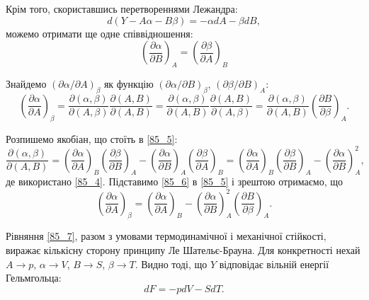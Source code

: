 Крім того, скориставшись перетвореннями Лежандра:
\begin{equation} \label{85_3}
d(Y - A \alpha - B \beta) = -\alpha dA - \beta dB,
\end{equation}
%
можемо отримати ще одне співвідношення:
\begin{equation} \label{85_4}
\left(\frac{\partial \alpha}{\partial B}\right)_A = \left(\frac{\partial \beta}{\partial A}\right)_B
\end{equation}

Знайдемо $(\partial \alpha / \partial A)_\beta$ як функцію $(\partial \alpha / \partial B)_\beta$, $(\partial \beta / \partial B)_A$:
\begin{equation} \label{85_5}
\left(\frac{\partial \alpha}{\partial A}\right)_\beta = \frac{\partial (\alpha, \beta)}{\partial (A, \beta)} \frac{\partial (A, B)}{\partial (A, B)} = \frac{\partial (\alpha, \beta)}{\partial (A, B)} \frac{\partial (A, B)}{\partial (A, \beta)} = \frac{\partial (\alpha, \beta)}{\partial (A, B)} \left(\frac{\partial B}{\partial \beta}\right)_A.
\end{equation}

Розпишемо якобіан, що стоїть в \eqref{85_5}:
\begin{equation} \label{85_6}
\frac{\partial (\alpha, \beta)}{\partial (A, B)} = \left(\frac{\partial \alpha}{\partial A}\right)_B \left(\frac{\partial \beta}{\partial B}\right)_A - \left(\frac{\partial \alpha}{\partial B}\right)_A \left(\frac{\partial \beta}{\partial A}\right)_B = \left(\frac{\partial \alpha}{\partial A}\right)_B \left(\frac{\partial \beta}{\partial B}\right)_A - \left(\frac{\partial \alpha}{\partial B}\right)_A^2,
\end{equation}
%
де використано \eqref{85_4}. Підставимо \eqref{85_6} в \eqref{85_5} і зрештою отримаємо, що
\begin{equation} \label{85_7}
\left(\frac{\partial \alpha}{\partial A}\right)_\beta = \left(\frac{\partial \alpha}{\partial A}\right)_B - \left(\frac{\partial \alpha}{\partial B}\right)_A^2 \left(\frac{\partial B}{\partial \beta}\right)_A.
\end{equation}

Рівняння \eqref{85_7}, разом з умовами термодинамічної і механічної стійкості, виражає кількісну сторону принципу Ле Шательє-Брауна. Для конкретності нехай $A \longrightarrow p$, $\alpha \longrightarrow V$, $B \longrightarrow S$, $\beta \longrightarrow T$. Видно тоді, що $Y$ відповідає вільній енергії Гельмгольца:
\begin{equation} \label{85_8}
dF = -p dV - S dT.
\end{equation}

